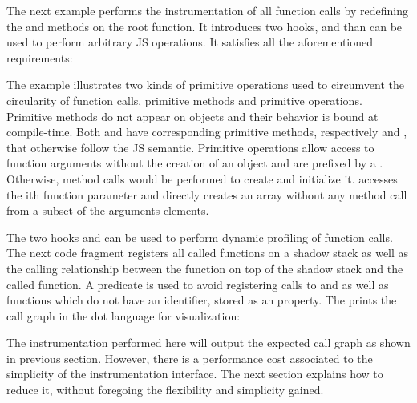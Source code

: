 The next example performs the instrumentation of all function calls by
redefining the  and  methods on the root function. It
introduces two hooks,  and  than can be used
to perform arbitrary JS operations. It satisfies all the aforementioned
requirements:


The example illustrates two kinds of primitive operations used to circumvent
the circularity of function calls, primitive methods and primitive
 operations.  Primitive methods do not appear on objects and
their behavior is bound at compile-time.  Both  and  have
corresponding primitive methods, respectively  and
, that otherwise follow the JS semantic. Primitive
 operations allow access to function arguments without the
creation of an  object and are prefixed by a \kw{\$}. Otherwise,
method calls would be performed to create and initialize it.
 accesses the ith function parameter and
 directly creates an array without any method call
from a subset of the arguments elements.

The two hooks  and  can be used to perform
dynamic profiling of function calls. The next code fragment registers all
called functions on a shadow stack as well as the calling relationship between
the function on top of the shadow stack and the called function. A predicate is
used to avoid registering calls to  and  as well as
functions which do not have an identifier, stored as an 
property. The  prints the call graph in the dot language for
visualization:


The instrumentation performed here will output the expected call graph as shown
in previous section. However, there is a performance cost associated to the
simplicity of the instrumentation interface. The next section explains how to
reduce it, without foregoing the flexibility and simplicity gained.




